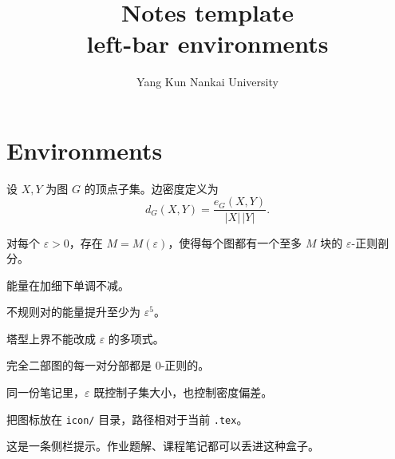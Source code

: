 \documentclass[a4paper,11pt]{article}
\title{\textbf{Notes template}\\[4pt]\large left-bar environments}
\author{Yang Kun \quad Nankai University}
\date{}
\begin{document}
\maketitle

\section{Environments}

\begin{definition}[边密度]
设 $X,Y$ 为图 $G$ 的顶点子集。边密度定义为
\[
d_G(X,Y)=\frac{e_G(X,Y)}{|X|\,|Y|}.
\]
\end{definition}

\begin{theorem}[正则性引理]
对每个 $\varepsilon>0$，存在 $M=M(\varepsilon)$，使得每个图都有一个至多 $M$ 块的 $\varepsilon$-正则剖分。
\end{theorem}

\begin{lemma}
能量在加细下单调不减。
\end{lemma}

\begin{proposition}
不规则对的能量提升至少为 $\varepsilon^5$。
\end{proposition}

\begin{corollary}
塔型上界不能改成 $\varepsilon$ 的多项式。
\end{corollary}

\begin{example}
完全二部图的每一对分部都是 $0$-正则的。
\end{example}

\begin{remark}
同一份笔记里，$\varepsilon$ 既控制子集大小，也控制密度偏差。
\end{remark}

\begin{note}
把图标放在 \texttt{icon/} 目录，路径相对于当前 \texttt{.tex}。
\end{note}

\begin{cbox}
这是一条侧栏提示。作业题解、课程笔记都可以丢进这种盒子。
\end{cbox}
\end{document}
